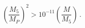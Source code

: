 \begin{equation}
\left(\frac{M_5}{M_P}\right)^2 > 10^{-11} \left(\frac{M}{M_5}\right)\,.
\label{strict}
\end{equation}

